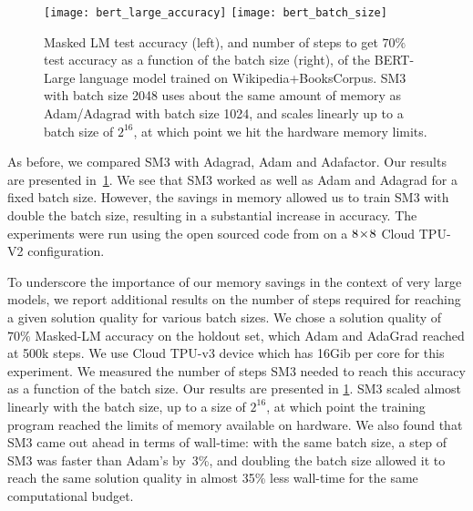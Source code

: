\documentclass[a4paper,11pt]{article}
\def\NAME{SM3\xspace}
\begin{document}
\begin{figure}[ht]
\begin{center}
\texttt{[image: bert\_large\_accuracy]}
\hspace{0.03\columnwidth}
\texttt{[image: bert\_batch\_size]}
\end{center}
\vspace{-0.5cm}
\caption{Masked LM test accuracy (left), and number of steps to get $70\%$ test accuracy
as a function of the batch size (right), of the BERT-Large language model
trained on Wikipedia+BooksCorpus.
\NAME with batch size 2048 uses about the same amount of memory as Adam/Adagrad
with batch size 1024, and scales linearly up to a batch size of $2^{16}$, at
which point we hit the hardware memory limits.}
\label{bert_large_loss}
\end{figure}

As before, we compared \NAME with Adagrad, Adam and Adafactor. Our results are
presented in~\cref{bert_large_loss}. We see that \NAME worked as well as Adam
and Adagrad for a fixed batch size. However, the savings in memory
allowed us to train \NAME with double the batch size, resulting in a substantial
increase in accuracy. The experiments were run using the open sourced code from
\cite{devlin18} on a $\8x8$ Cloud TPU-V2 configuration.

To underscore the importance of our memory savings in the context of very large
models, we report additional results on the number of steps required for
reaching a given solution quality for various batch sizes. We chose a solution
quality of $70\%$ Masked-LM accuracy on the holdout set, which Adam and AdaGrad
reached at 500k steps. We use Cloud TPU-v3 device which has 16Gib per core for
this experiment. We measured the number of steps \NAME needed to reach this
accuracy as a function of the batch size. Our results are presented in
\cref{bert_large_loss}. \NAME scaled almost linearly with the batch size, up to
a size of $2^{16}$, at which point the training program reached the limits of
memory available on hardware. We also found that \NAME came out ahead in terms
of wall-time: with the same batch size, a step of \NAME was faster than Adam's
by~3\%, and doubling the batch size allowed it to reach the same solution
quality in almost 35\% less wall-time for the same computational budget.
\end{document}
